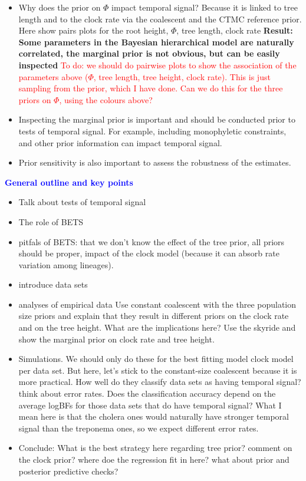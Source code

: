 \documentclass[11pt]{article}
\begin{document}
\begin{itemize}
	\item Why does the prior on $\Phi$ impact temporal signal? Because it is linked to tree length and to the clock rate via the coalescent and the CTMC reference prior. Here show pairs plots for the root height, $\Phi$, tree length, clock rate \textbf{Result: Some parameters in the Bayesian hierarchical model are naturally correlated, the marginal prior is not obvious, but can be easily inspected}
            \subitem \textcolor{red}{To do: we should do pairwise plots to show the association of the parameters above ($\Phi$, tree length, tree height, clock rate). This is just sampling from the prior, which I have done. Can we do this for the three priors on $\Phi$, using the colours above?}   
        
	\item Inspecting the marginal prior is important and should be conducted prior to tests of temporal signal. For example, including monophyletic constraints, and other prior information can impact temporal signal. 
	\item Prior sensitivity is also important to assess the robustness of the estimates.
 
\end{itemize}

\Large{\textbf{\textcolor{blue}{General outline and key points}}}

\begin{itemize}
	\item Talk about tests of temporal signal
	\item The role of BETS
	\item pitfals of BETS: that we don't know the effect of the tree prior, all priors should be proper, impact of the clock model (because it can absorb rate variation among lineages).
	\item introduce data sets
	\item analyses of empirical data
	\subitem Use constant coalescent with the three population size priors and explain that they result in different priors on the clock rate and on the tree height. What are the implications here?
	\subitem Use the skyride and show the marginal prior on clock rate and tree height.
	\item Simulations. We should only do these for the best fitting model clock model per data set. But here, let's stick to the constant-size coalescent because it is more practical. 
	\subitem How well do they classify data sets as having temporal signal? think about error rates.
	\subitem Does the classification accuracy depend on the average logBFs for those data sets that do have temporal signal? What I mean here is that the cholera ones would naturally have stronger temporal signal than the treponema ones, so we expect different error rates. 
	\item Conclude: What is the best strategy here regarding tree prior? comment on the clock prior? where doe the regression fit in here? what about prior and posterior predictive checks?
\end{itemize}
\end{document}
